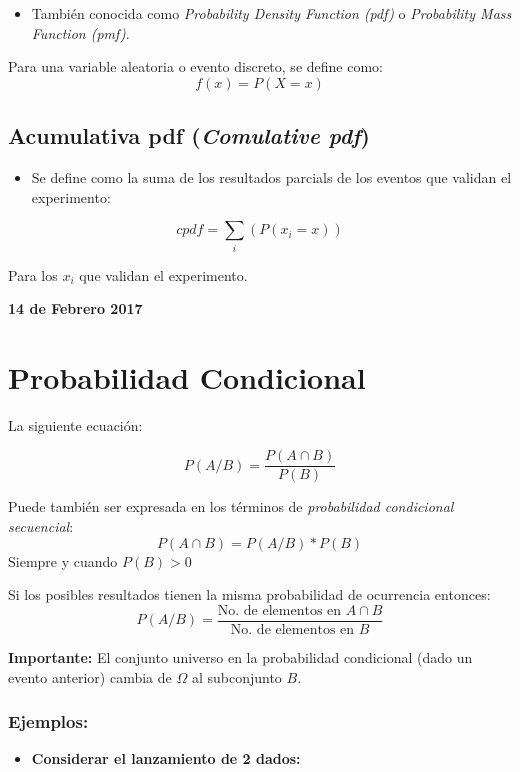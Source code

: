 \documentclass[]{book}
\providecommand{\tightlist}{%
  \setlength{\itemsep}{0pt}\setlength{\parskip}{0pt}}
\begin{document}
\begin{itemize}
\tightlist
\item
  También conocida como \emph{Probability Density Function (pdf)} o
  \emph{Probability Mass Function (pmf)}.
\end{itemize}

Para una variable aleatoria o evento discreto, se define como:
\[f(x) = P(X=x)\]

\subsection{\texorpdfstring{Acumulativa pdf (\emph{Comulative
pdf})}{Acumulativa pdf (Comulative pdf)}}\label{acumulativa-pdf-comulative-pdf-1}

\begin{itemize}
\tightlist
\item
  Se define como la suma de los resultados parcials de los eventos que
  validan el experimento:
\end{itemize}

\[cpdf = \sum_{i}(P(x_i=x))\]

Para los \(x_i\) que validan el experimento.

\textbf{14 de Febrero 2017}

\section{Probabilidad Condicional}\label{probabilidad-condicional-1}

La siguiente ecuación:

\[P(A/B) = \frac{P(A\cap B)}{P(B)}\]

Puede también ser expresada en los términos de \emph{probabilidad
condicional secuencial}: \[P(A\cap B) = P(A/B)*P(B)\] Siempre y cuando
\(P(B)>0\)

Si los posibles resultados tienen la misma probabilidad de ocurrencia
entonces:
\[P(A/B) = \frac{\text{No. de elementos en } A\cap B}{\text{No. de elementos en }B}\]

\textbf{Importante:} El conjunto universo en la probabilidad condicional
(dado un evento anterior) cambia de \(\Omega\) al subconjunto \(B\).

\subsubsection{Ejemplos:}\label{ejemplos-1}

\begin{itemize}
\tightlist
\item
  \textbf{Considerar el lanzamiento de 2 dados:}
\end{itemize}
\end{document}
